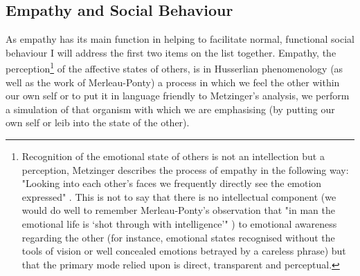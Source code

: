\subsection{Empathy and Social Behaviour}

As empathy has its main function in helping to facilitate normal, functional social behaviour I will address the first two items on the list together. Empathy, the perception\footnote{Recognition of the emotional state of others is not an intellection but a perception, Metzinger describes the process of empathy in the following way: "Looking into each other's faces we frequently directly see the emotion expressed" \cite[p. 168]{metzinger2003}. This is not to say that there is no intellectual component (we would do well to remember Merleau-Ponty's observation that "in man the emotional life is ‘shot through with intelligence'" \cite[p. 179]{merleauponty1962}) to emotional awareness regarding the other (for instance, emotional states recognised without the tools of vision or well concealed emotions betrayed by a careless phrase) but that the primary mode relied upon is direct, transparent and perceptual.} of the affective states of others, is in Husserlian phenomenology (as well as the work of Merleau-Ponty) a process in which we feel the other within our own self or to put it in language friendly to Metzinger's analysis, we perform a simulation of that organism with which we are emphasising (by putting our own self or leib into the state of the other).

